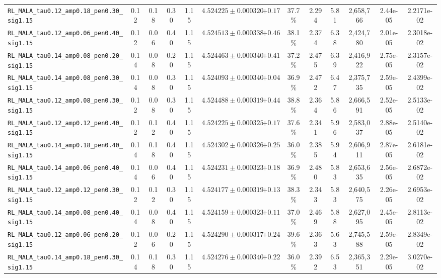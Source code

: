 \documentclass[10pt,a4paper]{article}
\begin{document}
\begin{table}[H]
\begin{adjustbox}{max width=\textwidth}
\begin{tabular}{lcccccccccccc}
\texttt{RL\_MALA\_tau0.12\_amp0.18\_pen0.30\_sig1.15} & 0.12 & 0.18 & 0.30 & 1.15 & $4.524225 \pm 0.000320$ & $+0.17$ & 37.7\% & 2.294 & 5.81 & 2,658,766 & 2.44e-05 & 2.2171e-02 \\
\texttt{RL\_MALA\_tau0.12\_amp0.06\_pen0.40\_sig1.15} & 0.12 & 0.06 & 0.40 & 1.15 & $4.524513 \pm 0.000338$ & $+0.46$ & 38.1\% & 2.374 & 6.38 & 2,424,780 & 2.01e-05 & 2.3018e-02 \\
\texttt{RL\_MALA\_tau0.14\_amp0.08\_pen0.20\_sig1.15} & 0.14 & 0.08 & 0.20 & 1.15 & $4.524463 \pm 0.000340$ & $+0.41$ & 37.2\% & 2.475 & 6.39 & 2,416,922 & 2.75e-05 & 2.3157e-02 \\
\texttt{RL\_MALA\_tau0.14\_amp0.08\_pen0.30\_sig1.15} & 0.14 & 0.08 & 0.30 & 1.15 & $4.524093 \pm 0.000340$ & $+0.04$ & 36.9\% & 2.472 & 6.47 & 2,375,735 & 2.59e-05 & 2.4399e-02 \\
\texttt{RL\_MALA\_tau0.12\_amp0.08\_pen0.30\_sig1.15} & 0.12 & 0.08 & 0.30 & 1.15 & $4.524488 \pm 0.000319$ & $+0.44$ & 38.8\% & 2.364 & 5.86 & 2,666,591 & 2.52e-05 & 2.5133e-02 \\
\texttt{RL\_MALA\_tau0.12\_amp0.12\_pen0.40\_sig1.15} & 0.12 & 0.12 & 0.40 & 1.15 & $4.524225 \pm 0.000325$ & $+0.17$ & 37.6\% & 2.341 & 5.96 & 2,583,037 & 2.88e-05 & 2.5140e-02 \\
\texttt{RL\_MALA\_tau0.14\_amp0.18\_pen0.40\_sig1.15} & 0.14 & 0.18 & 0.40 & 1.15 & $4.524302 \pm 0.000326$ & $+0.25$ & 36.0\% & 2.385 & 5.94 & 2,606,911 & 2.87e-05 & 2.6181e-02 \\
\texttt{RL\_MALA\_tau0.14\_amp0.06\_pen0.40\_sig1.15} & 0.14 & 0.06 & 0.40 & 1.15 & $4.524231 \pm 0.000323$ & $+0.18$ & 36.9\% & 2.480 & 5.83 & 2,653,635 & 2.56e-05 & 2.6872e-02 \\
\texttt{RL\_MALA\_tau0.12\_amp0.12\_pen0.30\_sig1.15} & 0.12 & 0.12 & 0.30 & 1.15 & $4.524177 \pm 0.000319$ & $+0.13$ & 38.3\% & 2.343 & 5.83 & 2,640,575 & 2.26e-05 & 2.6953e-02 \\
\texttt{RL\_MALA\_tau0.14\_amp0.08\_pen0.40\_sig1.15} & 0.14 & 0.08 & 0.40 & 1.15 & $4.524159 \pm 0.000323$ & $+0.11$ & 37.0\% & 2.469 & 5.88 & 2,627,095 & 2.45e-05 & 2.8113e-02 \\
\texttt{RL\_MALA\_tau0.12\_amp0.06\_pen0.20\_sig1.15} & 0.12 & 0.06 & 0.20 & 1.15 & $4.524290 \pm 0.000317$ & $+0.24$ & 39.6\% & 2.363 & 5.63 & 2,745,588 & 2.59e-05 & 2.8349e-02 \\
\texttt{RL\_MALA\_tau0.14\_amp0.18\_pen0.30\_sig1.15} & 0.14 & 0.18 & 0.30 & 1.15 & $4.524276 \pm 0.000340$ & $+0.22$ & 36.0\% & 2.392 & 6.53 & 2,365,351 & 2.29e-05 & 3.0270e-02 \\

\end{tabular}
\end{adjustbox}
\end{table}
\end{document}
